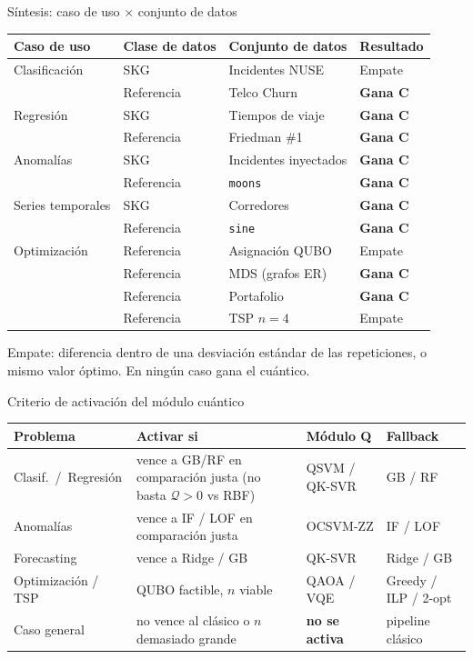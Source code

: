 \documentclass[aspectratio=169,10pt,professionalfonts]{beamer}
\newcommand{\ganaC}{\cellcolor{unirclaro}\textbf{Gana C}}
\newcommand{\empate}{\cellcolor{unirazul!14}Empate}
\begin{document}
\begin{frame}{Síntesis: caso de uso $\times$ conjunto de datos}
\centering
{\scriptsize
\renewcommand{\arraystretch}{1.0}
\setlength{\tabcolsep}{4pt}
\begin{tabular}{@{}llll@{}}
\toprule
\textbf{Caso de uso} & \textbf{Clase de datos} & \textbf{Conjunto de datos} & \textbf{Resultado} \\
\midrule
Clasificación & SKG & Incidentes NUSE & \empate \\
 & Referencia & Telco Churn & \ganaC \\
\midrule
Regresión & SKG & Tiempos de viaje & \ganaC \\
 & Referencia & Friedman \#1 & \ganaC \\
\midrule
Anomalías & SKG & Incidentes inyectados & \ganaC \\
 & Referencia & \texttt{moons} & \ganaC \\
\midrule
Series temporales & SKG & Corredores & \ganaC \\
 & Referencia & \texttt{sine} & \ganaC \\
\midrule
Optimización & Referencia & Asignación QUBO & \empate \\
 & Referencia & MDS (grafos ER) & \ganaC \\
 & Referencia & Portafolio & \ganaC \\
 & Referencia & TSP $n{=}4$ & \empate \\
\bottomrule
\end{tabular}}

\vspace{0.1em}
{\scriptsize Empate: diferencia dentro de una desviación estándar de las repeticiones, o mismo valor óptimo. En ningún caso gana el cuántico.}
\end{frame}

\begin{frame}{Criterio de activación del módulo cuántico}
\centering
{\footnotesize
\renewcommand{\arraystretch}{1.15}
\begin{tabular}{@{}>{\raggedright\arraybackslash}p{2.6cm}>{\raggedright\arraybackslash}p{3.6cm}>{\raggedright\arraybackslash}p{3.2cm}>{\raggedright\arraybackslash}p{3.0cm}@{}}
\toprule
\textbf{Problema} & \textbf{Activar si} & \textbf{Módulo Q} & \textbf{Fallback} \\
\midrule
Clasif.\ /\ Regresión &
vence a GB/RF
en comparación justa
(no basta $\mathcal{Q}>0$ vs RBF) &
QSVM / QK-SVR &
GB / RF \\
Anomalías &
vence a IF / LOF
en comparación justa &
OCSVM-ZZ &
IF / LOF \\
Forecasting &
vence a Ridge / GB &
QK-SVR &
Ridge / GB \\
Optimización / TSP &
QUBO factible, $n$ viable &
QAOA / VQE &
Greedy / ILP / 2-opt \\
Caso general &
no vence al clásico
o $n$ demasiado grande &
\textbf{no se activa} &
pipeline clásico \\
\bottomrule
\end{tabular}}
\end{frame}
\end{document}
